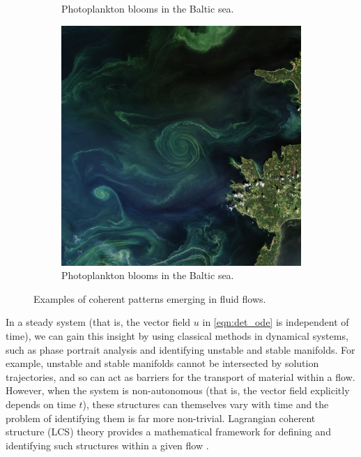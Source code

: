\begin{figure}
\begin{center}
\begin{subfigure}{0.49\textwidth}
			\caption{Photoplankton blooms in the Baltic sea.}
		\end{subfigure}
		\begin{subfigure}{0.49\textwidth}
			\includegraphics[width=\textwidth]{chp02_background/figures/photoplankton}
			\caption{Photoplankton blooms in the Baltic sea.}
		\end{subfigure}
		\caption{Examples of coherent patterns emerging in fluid flows.}
		\label{fig:lcs_examples}
	\end{center}
\end{figure}

In a steady system (that is, the vector field \(u\) in \cref{eqn:det_ode} is independent of time), we can gain this insight by using classical methods in dynamical systems, such as phase portrait analysis and identifying unstable and stable manifolds.
For example, unstable and stable manifolds cannot be intersected by solution trajectories, and so can act as barriers for the transport of material within a flow.
However, when the system is non-autonomous (that is, the vector field explicitly depends on time \(t\)), these structures can themselves vary with time and the problem of identifying them is far more non-trivial.
Lagrangian coherent structure (LCS) theory provides a mathematical framework for defining and identifying such structures within a given flow \citep{BalasuriyaEtAl_2018_GeneralizedLagrangianCoherent}.

